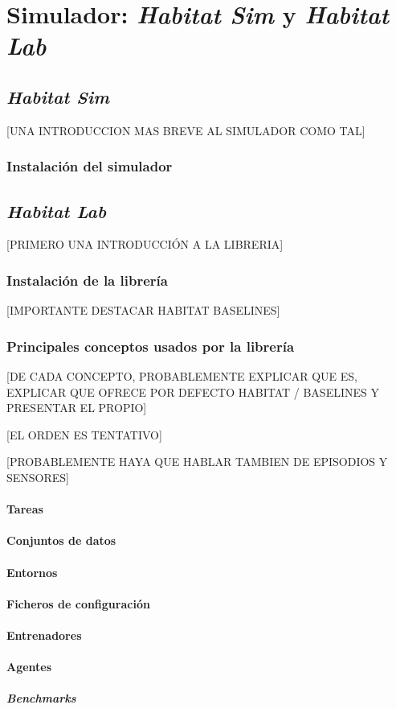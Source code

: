 \chapter{Simulador: \textit{Habitat Sim} y \textit{Habitat Lab}}

\section{\textit{Habitat Sim}}
[UNA INTRODUCCION MAS BREVE AL SIMULADOR COMO TAL]

\subsection{Instalación del simulador}

\section{\textit{Habitat Lab}}
[PRIMERO UNA INTRODUCCIÓN A LA LIBRERIA]

\subsection{Instalación de la librería}
[IMPORTANTE DESTACAR HABITAT BASELINES]

\subsection{Principales conceptos usados por la librería}
[DE CADA CONCEPTO, PROBABLEMENTE EXPLICAR QUE ES, EXPLICAR QUE OFRECE POR DEFECTO HABITAT / BASELINES Y PRESENTAR EL PROPIO]

[EL ORDEN ES TENTATIVO]

[PROBABLEMENTE HAYA QUE HABLAR TAMBIEN DE EPISODIOS Y SENSORES]

\subsubsection{Tareas}

\subsubsection{Conjuntos de datos}

\subsubsection{Entornos}

\subsubsection{Ficheros de configuración}

\subsubsection{Entrenadores}

\subsubsection{Agentes}

\subsubsection{\textit{Benchmarks}}